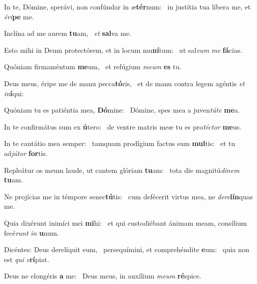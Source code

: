 \item In te, Dómine, sperávi, non confúndar in æ\textbf{tér}num:~\psstar{} in justítia tua líbera me, et \textit{éri}\textbf{pe} me.

\item Inclína ad me aurem \textbf{tu}am,~\psstar{} \textit{et} \textbf{sal}va me.

\item Esto mihi in Deum protectórem, et in locum mu\textbf{ní}tum:~\psstar{} ut sal\textit{vum} \textit{me} \textbf{fá}cias.

\item Quóniam firmaméntum \textbf{me}um,~\psstar{} et refúgium \textit{meum} \textbf{es} tu.

\item Deus meus, éripe me de manu pecca\textbf{tó}ris,~\psstar{} et de manu contra legem agéntis \textit{et} \textit{in}\textbf{í}qui:

\item Quóniam tu es patiéntia mea, \textbf{Dó}mine:~\psstar{} Dómine, spes mea a juven\textit{túte} \textbf{me}a.

\item In te confirmátus sum ex \textbf{ú}tero:~\psstar{} de ventre matris meæ tu es pro\textit{téctor} \textbf{me}us.

\item In te cantátio mea semper:~\pscross{} tamquam prodígium factus sum \textbf{mul}tis:~\psstar{} et tu ad\textit{jútor} \textbf{for}tis.

\item Repleátur os meum laude, ut cantem glóriam \textbf{tu}am:~\psstar{} tota die magnitú\textit{dinem} \textbf{tu}am.

\item Ne projícias me in témpore senec\textbf{tú}tis:~\psstar{} cum defécerit virtus mea, ne \textit{dere}\textbf{lín}quas me.

\item Quia dixérunt inimíci mei \textbf{mi}hi:~\psstar{} et qui custodiébant ánimam meam, consílium fecé\textit{runt} \textit{in} \textbf{u}num.

\item Dicéntes: Deus derelíquit eum,~\pscross{} persequímini, et comprehéndite \textbf{e}um:~\psstar{} quia non est \textit{qui} \textit{e}\textbf{rí}piat.

\item Deus ne elongéris \textbf{a} me:~\psstar{} Deus meus, in auxílium \textit{meum} \textbf{ré}spice.

